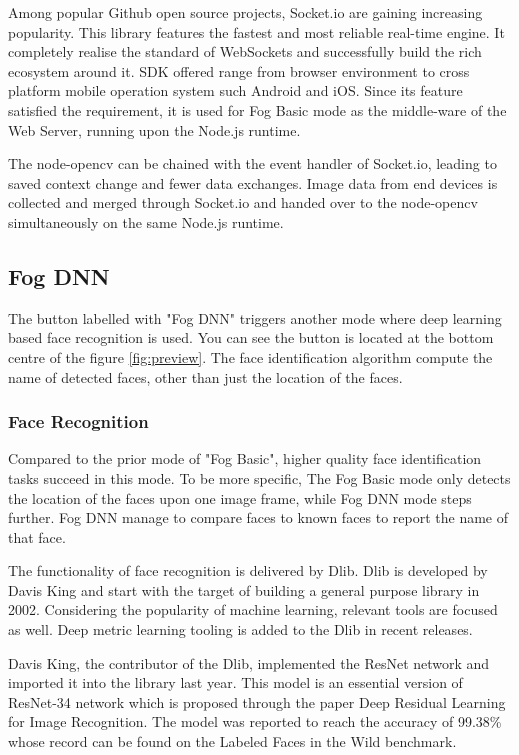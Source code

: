 Among popular Github open source projects, Socket.io are gaining increasing popularity. This library features the fastest and most reliable real-time engine\cite{socketio}. It completely realise the standard of WebSockets and successfully build the rich ecosystem around it. SDK offered range from browser environment to cross platform mobile operation system such Android and iOS. Since its feature satisfied the requirement, it is used for Fog Basic mode as the middle-ware of the Web Server, running upon the Node.js runtime.

The node-opencv can be chained with the event handler of Socket.io, leading to saved context change and fewer data exchanges. Image data from end devices is collected and merged through Socket.io and handed over to the node-opencv simultaneously on the same Node.js runtime. 

\subsection{Fog DNN}
The button labelled with "Fog DNN" triggers another mode where deep learning based face recognition is used. You can see the button is located at the bottom centre of the figure \ref{fig:preview}.
The face identification algorithm compute the name of detected faces, other than just the location of the faces.  

\subsubsection{Face Recognition}
Compared to the prior mode of "Fog Basic", higher quality face identification tasks succeed in this mode. To be more specific, The Fog Basic mode only detects the location of the faces upon one image frame, while Fog DNN mode steps further. Fog DNN manage to compare faces to known faces to report the name of that face.

The functionality of face recognition is delivered by Dlib. Dlib is developed by Davis King and start with the target of building a general purpose library in 2002\cite{dlib09}. Considering the popularity of machine learning, relevant tools are focused as well. Deep metric learning tooling is added to the Dlib in recent releases.

Davis King, the contributor of the Dlib, implemented the ResNet network and imported it into the library last year. This model is an essential version of ResNet-34 network which is proposed through the paper Deep Residual Learning for Image Recognition\cite{he2016deep}. The model was reported to reach the accuracy of 99.38\% whose record can be found on the Labeled Faces in the Wild benchmark.

